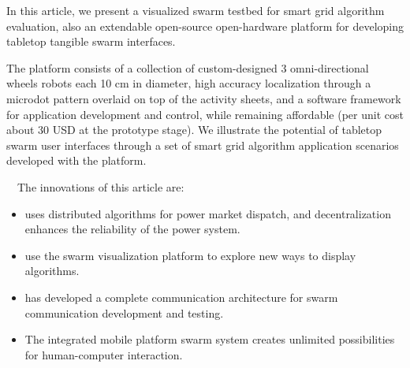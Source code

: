 \begin{eabstract}
  In this article, we present a visualized swarm testbed for smart grid algorithm evaluation, also an extendable open-source open-hardware platform for developing tabletop tangible swarm interfaces.

  The platform consists of a collection of custom-designed 3 omni-directional wheels robots each 10 cm in diameter, high accuracy localization through a microdot pattern overlaid on top of the activity sheets, and a software framework for application development and control, while remaining affordable (per unit cost about 30 USD at the prototype stage). We illustrate the potential of tabletop swarm user interfaces through a set of smart grid algorithm application scenarios developed with the platform.


  
  The innovations of this article are:

  \begin{itemize}
    \item uses distributed algorithms for power market dispatch, and decentralization enhances the reliability of the power system.
    \item use the swarm visualization platform to explore new ways to display algorithms.
    \item has developed a complete communication architecture for swarm communication development and testing.
    \item The integrated mobile platform swarm system creates unlimited possibilities for human-computer interaction.
  \end{itemize}


\end{eabstract}

